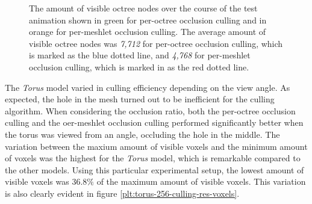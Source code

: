   \begin{figure}[h]            %
    \begin{center}
      \caption{The amount of visible octree nodes over the course of the test animation shown in green for 
      per-octree occlusion culling and in orange for per-meshlet occlusion culling. 
      The average amount of visible octree nodes was \emph{7,712} for per-octree occlusion culling, which is 
      marked as the blue dotted line, and \emph{4,768} for per-meshlet occlusion culling, which is marked in 
      as the red dotted line.}
      \label{plt:torus-256-culling-res-nodes}
    \end{center}
  \end{figure}


\noindent
The \emph{Torus} model varied in culling efficiency depending on the view angle. As expected, the hole 
in the mesh turned out to be inefficient for the culling algorithm. When considering the occlusion ratio, 
both the per-octree occlusion culling and the oer-meshlet occlusion culling performed significantly better 
when the torus was viewed from an angle, occluding the hole in the middle. The variation between the maxium 
amount of visible voxels and the minimum amount of voxels was the highest for the \emph{Torus} model, which 
is remarkable compared to the other models. Using this particular experimental setup, the lowest amount of 
visible voxels was $36.8\%$ of the maximum amount of visible voxels. This variation is also clearly evident 
in figure \ref{plt:torus-256-culling-res-voxels}. \\ 

